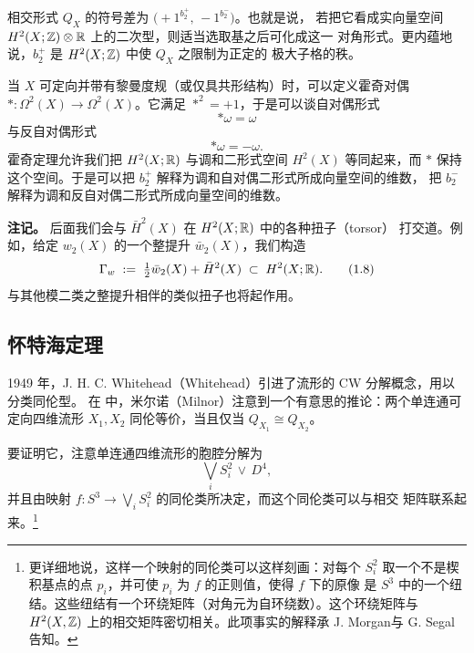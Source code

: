 相交形式 $Q_{X}$ 的符号差为 $\big(+1^{b^{+}_{2}},\,-1^{b^{-}_{2}}\big)$。也就是说，
若把它看成实向量空间 $H^{2}(X;\mathbb{Z})\otimes\mathbb{R}$ 上的二次型，则适当选取基之后可化成这一
对角形式。更内蕴地说，$b^{+}_{2}$ 是 $H^{2}(X;\mathbb{Z})$ 中使 $Q_{X}$ 之限制为正定的
极大子格的秩。

当 $X$ 可定向并带有黎曼度规（或仅具共形结构）时，可以定义霍奇对偶
$\ast:\Omega^{2}(X)\to\Omega^{2}(X)$。它满足 $\ast^{2}=+1$，于是可以谈自对偶形式
\begin{equation}
  \ast\omega=\omega
  \tag{1.6}
\end{equation}
与反自对偶形式
\begin{equation}
  \ast\omega=-\omega .
  \tag{1.7}
\end{equation}
霍奇定理允许我们把 $H^{2}(X;\mathbb{R})$ 与调和二形式空间 $H^{2}(X)$ 等同起来，而 $\ast$
保持这个空间。于是可以把 $b^{+}_{2}$ 解释为调和自对偶二形式所成向量空间的维数，
把 $b^{-}_{2}$ 解释为调和反自对偶二形式所成向量空间的维数。

\begin{remark*}
\textbf{注记。} 后面我们会与 $\bar{H}^{2}(X)$ 在 $H^{2}(X;\mathbb{R})$ 中的各种扭子（torsor）
打交道。例如，给定 $w_{2}(X)$ 的一个整提升 $\bar{w}_{2}(X)$，我们构造
\begin{equation}
  \Gamma_{w}\;:=\;\tfrac{1}{2}\bar{w}_{2}(X)+\bar{H}^{2}(X)\;\subset\;H^{2}(X;\mathbb{R}).
  \tag{1.8}
\end{equation}
与其他模二类之整提升相伴的类似扭子也将起作用。
\end{remark*}


\subsection{怀特海定理}

1949 年，J. H. C. Whitehead（Whitehead）引进了流形的 CW 分解概念，用以分类同伦型。
在 \cite{ref35} 中，米尔诺（Milnor）注意到一个有意思的推论：两个单连通可定向四维流形
$X_{1},X_{2}$ 同伦等价，当且仅当 $Q_{X_{1}}\cong Q_{X_{2}}$。

要证明它，注意单连通四维流形的胞腔分解为
\begin{equation}
  \bigvee_{i}S^{2}_{i}\,\vee\,D^{4},
  \tag{1.9}
\end{equation}
并且由映射 $f:S^{3}\to\bigvee_{i}S^{2}_{i}$ 的同伦类所决定，而这个同伦类可以与相交
矩阵联系起来。\footnote{更详细地说，这样一个映射的同伦类可以这样刻画：对每个 $S^{2}_{i}$
取一个不是楔积基点的点 $p_{i}$，并可使 $p_{i}$ 为 $f$ 的正则值，使得 $f$ 下的原像
是 $S^{3}$ 中的一个纽结。这些纽结有一个环绕矩阵（对角元为自环绕数）。这个环绕矩阵与
$H^{2}(X,\mathbb{Z})$ 上的相交矩阵密切相关。此项事实的解释承 J. Morgan与 G. Segal告知。}

